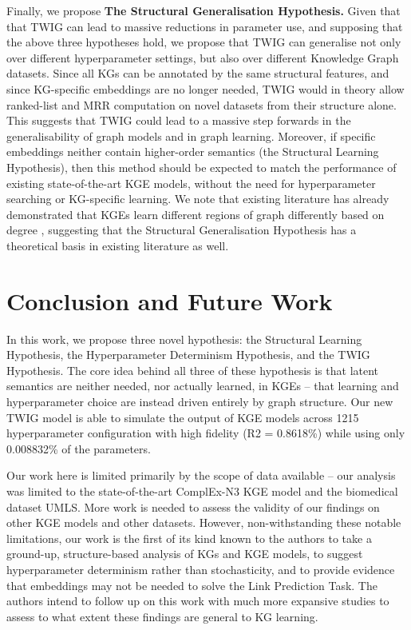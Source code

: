 Finally, we propose \textbf{The Structural Generalisation Hypothesis.} Given that that TWIG can lead to massive reductions in parameter use, and supposing that the above three hypotheses hold, we propose that TWIG can generalise not only over different hyperparameter settings, but also over different Knowledge Graph datasets. Since all KGs can be annotated by the same structural features, and since KG-specific embeddings are no longer needed, TWIG would in theory allow ranked-list and MRR computation on novel datasets from their structure alone. This suggests that TWIG could lead to a massive step forwards in the generalisability of graph models and in graph learning. Moreover, if specific embeddings neither contain higher-order semantics (the Structural Learning Hypothesis), then this method should be expected to match the performance of existing state-of-the-art KGE models, without the need for hyperparameter searching or KG-specific learning. We note that existing literature has already demonstrated that KGEs learn different regions of graph differently based on degree \cite{topological-imbalance}, suggesting that the Structural Generalisation Hypothesis has a theoretical basis in existing literature as well.

\section{Conclusion and Future Work}
In this work, we propose three novel hypothesis: the Structural Learning Hypothesis, the Hyperparameter Determinism Hypothesis, and the TWIG Hypothesis. The core idea behind all three of these hypothesis is that latent semantics are neither needed, nor actually learned, in KGEs -- that learning and hyperparameter choice are instead driven entirely by graph structure. Our new TWIG model is able to simulate the output of KGE models across 1215 hyperparameter configuration with high fidelity (R2 = 0.8618\%) while using only 0.008832\% of the parameters.

Our work here is limited primarily by the scope of data available -- our analysis was limited to the state-of-the-art ComplEx-N3 KGE model and the biomedical dataset UMLS. More work is needed to assess the validity of our findings on other KGE models and other datasets. However, non-withstanding these notable limitations, our work is the first of its kind known to the authors to take a ground-up, structure-based analysis of KGs and KGE models, to suggest hyperparameter determinism rather than stochasticity, and to provide evidence that embeddings may not be needed to solve the Link Prediction Task. The authors intend to follow up on this work with much more expansive studies to assess to what extent these findings are general to KG learning.

